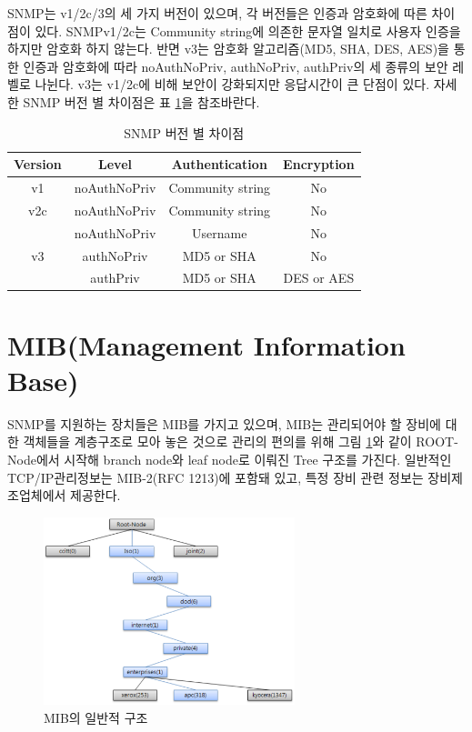 \documentclass[11pt
  , a4paper
  , article
  , oneside
]{memoir}
\begin{document}
\hfil\break
\hfil\break
\hfil\break
\hfil\break

SNMP는 v1/2c/3의 세 가지 버전이 있으며, 각 버전들은 인증과 암호화에 따른 차이점이 있다. SNMPv1/2c는 Community string에 의존한 문자열 일치로 사용자 인증을 하지만 암호화 하지 않는다. 반면 v3는 암호화 알고리즘(MD5, SHA, DES, AES)을 통한 인증과 암호화에 따라 noAuthNoPriv, authNoPriv, authPriv의 세 종류의 보안 레벨로 나뉜다. v3는 v1/2c에 비해 보안이 강화되지만 응답시간이 큰 단점이 있다. 자세한 SNMP 버전 별 차이점은 표 \ref{table:conparision}\citep{comparison}을 참조바란다.

\begin{table}[h!]
\begin{center}
\begin{tabular}{c|c|c|c}\hline
Version & Level & Authentication & Encryption \\ \hline
v1 & noAuthNoPriv & Community string & No \\ \hline
v2c & noAuthNoPriv & Community string & No \\ \hline
 & noAuthNoPriv & Username & No \\ \cline{2-4}
v3 & authNoPriv & MD5 or SHA & No \\ \cline{2-4}
 & authPriv & MD5 or SHA & DES or AES \\ \hline
\end{tabular}
\caption{SNMP 버전 별 차이점}
  \label{table:conparision} 
\end{center}
\end{table} 

\clearpage
\section{MIB(Management Information Base)}
SNMP를 지원하는 장치들은 MIB를 가지고 있으며, MIB는 관리되어야 할 장비에 대한 객체들을 계층구조로 모아 놓은 것으로 관리의 편의를 위해 그림 \ref{fig:oid_tree}와 같이 ROOT-Node에서 시작해 branch node와 leaf node로 이뤄진 Tree 구조를 가진다. 일반적인 TCP/IP관리정보는 MIB-2(RFC 1213)에 포함돼 있고, 특정 장비 관련 정보는 장비제조업체에서 제공한다. 

\begin{figure}[h!]
  \centering
  \includegraphics[width=0.65\textwidth]{./images/oid_tree.eps}
  \caption{MIB의 일반적 구조}
  \label{fig:oid_tree} 
\end{figure}
\end{document}
